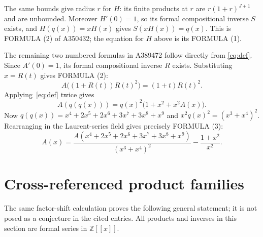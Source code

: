 \documentclass[11pt]{article}
\begin{document}
The same bounds give radius $r$ for $H$: its finite products at $r$
are $r(1+r)^{J+1}$ and are unbounded. Moreover $H'(0)=1$, so its
formal compositional inverse $S$ exists, and $H(q(x))=xH(x)$ gives
$S(xH(x))=q(x)$. This is FORMULA (2) of A350432; the equation for
$H$ above is its FORMULA (1).

The remaining two numbered formulas in A389472 follow directly from
\eqref{eq:def}. Since $A'(0)=1$, its formal compositional inverse
$R$ exists. Substituting $x=R(t)$ gives FORMULA (2):
\[
 A\bigl((1+R(t))R(t)^2\bigr)=(1+t)R(t)^2.
\]
Applying~\eqref{eq:def} twice gives
\[
 A(q(q(x)))=q(x)^2\bigl(1+x^2+x^2A(x)\bigr).
\]
Now $q(q(x))=x^4+2x^5+2x^6+3x^7+3x^8+x^9$ and
$x^2q(x)^2=(x^3+x^4)^2$. Rearranging in the Laurent-series
field gives precisely FORMULA (3):
\[
 A(x)=\frac{A(x^4+2x^5+2x^6+3x^7+3x^8+x^9)}{(x^3+x^4)^2}
       -\frac{1+x^2}{x^2}.
\]

\section{Cross-referenced product families}
The same factor-shift calculation proves the following general statement;
it is not posed as a conjecture in the cited entries. All products and
inverses in this section are formal series in $\mathbb Z[[x]]$.
\end{document}

